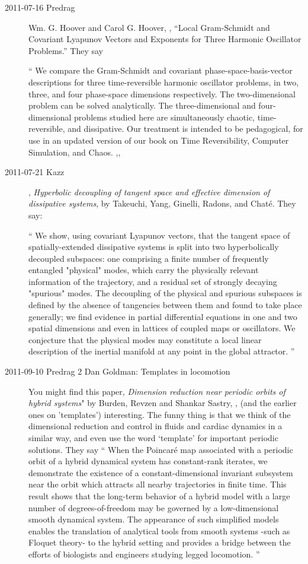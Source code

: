 \begin{description}
\item[2011-07-16 Predrag]
Wm. G. Hoover and Carol G. Hoover, ,
``Local Gram-Schmidt and Covariant Lyapunov Vectors and Exponents for
 Three Harmonic Oscillator Problems.'' They say

``
We compare the Gram-Schmidt and covariant phase-space-basis-vector
descriptions for three time-reversible harmonic oscillator problems, in two,
three, and four phase-space dimensions respectively. The two-dimensional
problem can be solved analytically. The three-dimensional and four-dimensional
problems studied here are simultaneously chaotic, time-reversible, and
dissipative. Our treatment is intended to be pedagogical, for use in an updated
version of our book on Time Reversibility, Computer Simulation, and Chaos.
,,

\item[2011-07-21 Kazz] ,
\emph{Hyperbolic decoupling of tangent space
      and effective dimension of dissipative systems},
by Takeuchi, Yang, Ginelli, Radons, and Chat\'e.
They say:

``
We show, using covariant Lyapunov vectors, that the tangent space of
spatially-extended dissipative systems is split into two hyperbolically
decoupled subspaces: one comprising a finite number of frequently
entangled "physical" modes, which carry the physically relevant
information of the trajectory, and a residual set of strongly decaying
"spurious" modes. The decoupling of the physical and spurious subspaces
is defined by the absence of tangencies between them and found to take
place generally; we find evidence in partial differential equations in
one and two spatial dimensions and even in lattices of coupled maps or
oscillators. We conjecture that the physical modes may constitute a local
linear description of the inertial manifold at any point in the global
attractor.
''

\newpage
\item[2011-09-10 Predrag 2 Dan Goldman: Templates in locomotion]
You might find this paper,
\emph{Dimension reduction near periodic orbits of hybrid systems}"
by Burden, Revzen and Shankar Sastry, ,
(and the earlier ones on 'templates')
interesting. The funny thing is that we think of the dimensional
reduction and control in fluids and cardiac dynamics in a similar way,
and even use the word `template' for important periodic solutions.
They say
``
When the Poincar\'{e} map associated with a periodic orbit of a hybrid
dynamical system has constant-rank iterates, we demonstrate the existence of a
constant-dimensional invariant subsystem near the orbit which attracts all
nearby trajectories in finite time. This result shows that the long-term
behavior of a hybrid model with a large number of degrees-of-freedom may be
governed by a low-dimensional smooth dynamical system. The appearance of such
simplified models enables the translation of analytical tools from smooth
systems -such as Floquet theory- to the hybrid setting and provides a bridge
between the efforts of biologists and engineers studying legged locomotion.
''


\end{description}
